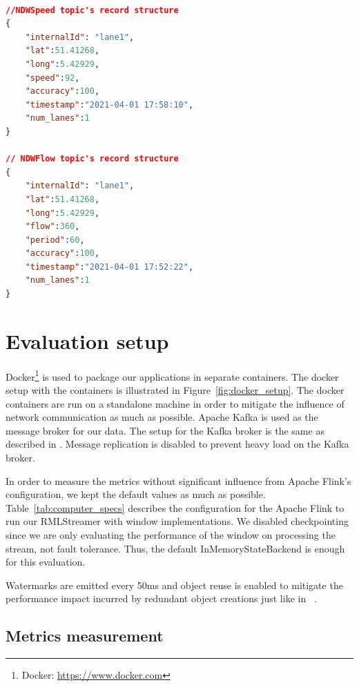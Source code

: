 \begin{lstlisting}[language=JSON, 
caption={JSON data structure of the records.}, 
label={lst:record_json_structure} ]

//NDWSpeed topic's record structure
{
    "internalId": "lane1", 
    "lat":51.41268,
    "long":5.42929,
    "speed":92,
    "accuracy":100,
    "timestamp":"2021-04-01 17:58:10",
    "num_lanes":1
}

// NDWFlow topic's record structure
{
    "internalId": "lane1", 
    "lat":51.41268,
    "long":5.42929,
    "flow":360,
    "period":60,
    "accuracy":100,
    "timestamp":"2021-04-01 17:52:22",
    "num_lanes":1
}
\end{lstlisting}




\section{Evaluation setup}

Docker\footnote{Docker: \url{https://www.docker.com}} is used to package 
our applications in separate containers. The docker setup with the containers 
is illustrated in Figure~\ref{fig:docker_setup}. The docker containers 
are run on a standalone machine in order to mitigate the influence of 
network communication as much as possible. Apache Kafka is used 
as the message broker for our data. The setup for the Kafka broker is 
the same as described in \cite{evalution_of_spe}. Message replication 
is disabled to prevent heavy load on the Kafka broker. 

In order to measure the metrics without significant influence from  
Apache Flink's configuration, we kept the default values as much as possible. 
Table~\ref{tab:computer_specs} describes the configuration for the 
Apache Flink to run our RMLStreamer with window implementations. We 
disabled checkpointing since we are only evaluating the performance of 
the window on processing the stream, not fault tolerance. Thus, the 
default InMemoryStateBackend is enough for this evaluation.

Watermarks are emitted every 50ms and object reuse is enabled to 
mitigate the performance impact incurred by redundant object creations just 
like in ~\cite{evalution_of_spe}. 

\subsection{Metrics measurement}%
\label{sub:Metrics measurement}

